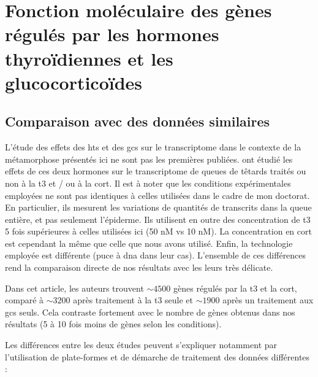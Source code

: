 \documentclass[../main.tex]{subfiles}
\begin{document}
\chapter{Fonction moléculaire des gènes régulés par les hormones thyroïdiennes et les glucocorticoïdes}


\section{Comparaison avec des données similaires}

	L'étude des effets des \glspl{ht} et des \glspl{gc} sur le transcriptome dans le contexte de la métamorphose présentés ici ne sont pas les premières publiées.
	\citet{Kulkarni2012} ont étudié les effets de ces deux hormones sur le transcriptome de queues de têtards traités ou non à la \gls{t3} et / ou à la \gls{cort}.
	Il est à noter que les conditions expérimentales employées ne sont pas identiques à celles utilisées dans le cadre de mon doctorat.
	En particulier, ils mesurent les variations de quantités de transcrits dans la queue entière, et pas seulement l'épiderme.
	Ils utilisent en outre des concentration de \gls{t3} 5 fois supérieures à celles utilisées ici (50 nM vs 10 nM).
	La concentration en \gls{cort} est cependant la même que celle que nous avons utilisé.
	Enfin, la technologie employée est différente (puce à \gls{dna} dans leur cas).
	L'ensemble de ces différences rend la comparaison directe de nos résultats avec les leurs très délicate.
	\par
	Dans cet article, les auteurs trouvent $\sim 4500$ gènes régulés par la \gls{t3} et la \gls{cort}, comparé à $\sim 3200$ après traitement à la \gls{t3} seule et $\sim 1900$ après un traitement aux \glspl{gc} seuls.
	Cela contraste fortement avec le nombre de gènes obtenus dans nos résultats (5 à 10 fois moins de gènes selon les conditions).
	\par
	Les différences entre les deux études peuvent s'expliquer notamment par l'utilisation de plate-formes et de démarche de traitement des données différentes :
\end{document}

